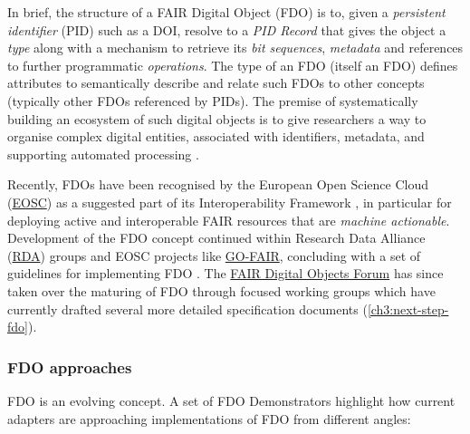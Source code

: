 In brief, the structure of a FAIR Digital Object (FDO) is to, given a \emph{persistent identifier} (PID) such as a DOI, resolve to a \emph{PID Record} that gives the object a \emph{type} along with a mechanism to retrieve its \emph{bit sequences}, \emph{metadata} and references to further programmatic \emph{operations}. The type of an FDO (itself an FDO) defines attributes to semantically describe and relate such FDOs to other concepts (typically other FDOs referenced by PIDs). The premise of systematically building an ecosystem of such digital objects is to give researchers a way to organise complex digital entities, associated with identifiers, metadata, and supporting automated processing \cite{wittenburgDigitalObjectsDrivers2019a}.

Recently, FDOs have been recognised by the European Open Science Cloud (\href{https://eosc.eu/}{EOSC}) as a suggested part of its Interoperability Framework \cite{corchoEOSCInteroperabilityFramework2021b}, in particular for deploying active and interoperable FAIR resources that are \emph{machine actionable}. Development of the FDO concept continued within Research Data Alliance (\href{https://www.rd-alliance.org/}{RDA}) groups and EOSC projects like \href{https://www.go-fair.org/}{GO-FAIR}, concluding with a set of guidelines for implementing FDO \cite{boninoFAIRDigitalObject}. The \href{https://fairdo.org/}{FAIR Digital Objects Forum} has since taken over the maturing of FDO through focused working groups which have currently drafted several more detailed specification documents (\vref*{ch3:next-step-fdo}).

\hypertarget{fdo-approaches}{%
\subsubsection{FDO approaches}\label{fdo-approaches}}

FDO is an evolving concept. A set of FDO Demonstrators \cite{wittenburgFAIRDigitalObject2022b} highlight how current adapters are approaching implementations of FDO from different angles:

